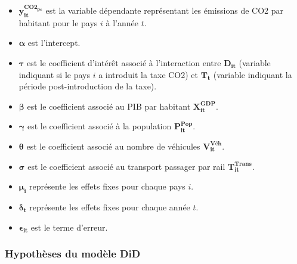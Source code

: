 \begin{itemize}
    \item[] $\mathbf{y_{it}^{CO2_{pc}}}$ \quad est la variable dépendante représentant les émissions de CO2 par habitant pour le pays $i$ à l'année $t$.
    \item[] $\boldsymbol{\alpha}$ \quad  est l'intercept.
    \item[] $\boldsymbol{\tau}$ est le coefficient d'intérêt associé à l'interaction entre $\mathbf{D_{it}}$ (variable indiquant si le pays $i$ a introduit la taxe CO2) et $\mathbf{T_t}$ (variable indiquant la période post-introduction de la taxe).
    \item[] $\boldsymbol{\beta}$ \quad  est le coefficient associé au PIB par habitant $\mathbf{X_{it}^{GDP}}$.
    \item[] $\boldsymbol{\gamma}$ \quad  est le coefficient associé à la population $\mathbf{P_{it}^{Pop}}$.
    \item[] $\boldsymbol{\theta}$ \quad  est le coefficient associé au nombre de véhicules $\mathbf{V_{it}^{Véh}}$.
    \item[] $\boldsymbol{\sigma}$ \quad  est le coefficient associé au transport passager par rail $\mathbf{T_{it}^{Trans}}$.
    \item[] $\boldsymbol{\mu_i}$ \quad  représente les effets fixes pour chaque pays $i$.
    \item[] $\boldsymbol{\delta_t}$ \quad représente les effets fixes pour chaque année $t$.
    \item[] $\boldsymbol{\epsilon_{it}}$ \quad  est le terme d'erreur.
\end{itemize}


\subsubsection{Hypothèses du modèle DiD}
\label{subsubsec:strategie_did_hypothesis}

